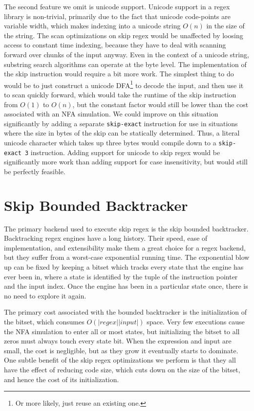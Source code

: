 The second feature we omit is unicode support. Unicode support in
a regex library is non-trivial, primarily due to the fact that
unicode code-points are variable width, which makes indexing into
a unicode string $O(n)$ in the size of the string. The scan optimizations
on skip regex would be unaffected by loosing access to constant time
indexing, because they have to deal
with scanning forward over chunks of the input anyway. Even in the
context of a unicode string, substring search algorithms can operate at
the byte level. The implementation of the skip instruction would require
a bit more work. The simplest thing to do would be to just construct
a unicode DFA\footnote{Or more likely, just reuse an existing one.}
to decode the input, and then use it to scan quickly
forward, which would take the runtime of the skip instruction from
$O(1)$ to $O(n)$, but the constant factor would still be lower
than the cost associated with an NFA simulation. We could improve on
this situation significantly by adding a separate \verb'skip-exact'
instruction for use in situations where the size in bytes of the
skip can be statically determined. Thus, a literal unicode character
which takes up three bytes would compile down to a \verb'skip-exact 3'
instruction. Adding support for unicode to skip regex would be significantly
more work than adding support for case insensitivity, but would still be
perfectly feasible.

\section{Skip Bounded Backtracker}

The primary backend used to execute skip regex is the skip bounded
backtracker. Backtracking regex engines have a long history.
Their speed, ease of implementation, and extensibility make them
a great choice for a regex backend, but they suffer from a worst-case
exponential running time. The exponential blow up can be fixed by
keeping a bitset which tracks every state that the engine has
ever been in, where a state is identified by the tuple of the
instruction pointer and the input index. Once the engine has
been in a particular state once, there is no need to explore it
again.

The primary cost associated with the bounded backtracker is
the initialization of the bitset, which consumes $O(|regex||input|)$
space. Very few executions cause the NFA simulation to enter all
or most states, but initializing the bitset to all zeros must always
touch every state bit. When the expression and input are small, the
cost is negligible, but as they grow it eventually starts to dominate.
One subtle benefit of the skip regex optimizations we perform is that
they all have the effect of reducing code size,
which cuts down on the size of the bitset, and hence the cost of
its initialization.


